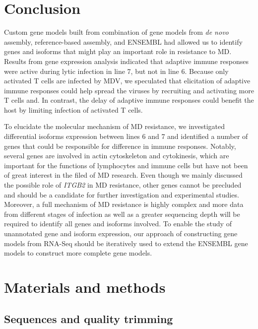 \documentclass[10pt]{article}
\begin{document}
\section*{Conclusion}

Custom gene models built from combination of gene models from {\em de novo}
assembly, reference-based assembly, and ENSEMBL had allowed us to identify genes
and isoforms that might play an important role in resistance to MD.  Results
from gene expression analysis indicated that adaptive immune responses were
active during lytic infection in line 7, but not in line 6.  Because only
activated T cells are infected by MDV, we speculated that elicitation of
adaptive immune responses could help spread the viruses by recruiting and
activating more T cells and.  In contrast, the delay of adaptive immune
responses could benefit the host by limiting infection of activated T cells.

To elucidate the molecular mechanism of MD resistance, we investigated
differential isoforms expression between lines 6 and 7 and identified a number
of genes that could be responsible for difference in immune responses. Notably,
several genes are involved in actin cytoskeleton and cytokinesis, which are
important for the functions of lymphocytes and immune cells but have not been of
great interest in the filed of MD research.  Even though we mainly discussed the
possible role of {\em ITGB2} in MD resistance, other genes cannot be precluded
and should be a candidate for further investigation and experimental studies.
Moreover, a full mechanism of MD resistance is highly complex and more data from
different stages of infection as well as a greater sequencing depth will be
required to identify all genes and isoforms involved.  To enable the study of
unannotated gene and isoform expression, our approach of constructing gene
models from RNA-Seq should be iteratively used to extend the ENSEMBL gene models
to construct more complete gene models.

\section*{Materials and methods}

\subsection{Sequences and quality trimming}
\end{document}
